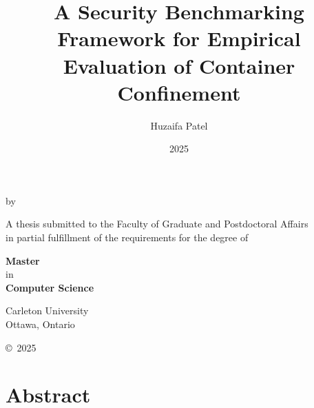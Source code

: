 \documentclass[12pt]{report}
\begin{document}
	\title{A Security Benchmarking Framework for Empirical Evaluation of Container Confinement}
\author{Huzaifa Patel}
\date{2025}

\makeatletter
\begin{titlepage}
     \begin{center}
        \vspace*{3cm} 

        {\LARGE \textbf{\@title} \par} 

        \vspace{0.5cm}

        \vspace{2cm}
        \large{by}
        \vspace{0.5cm}

        {\Large \textbf{\@author}} 

        \vfill

        {\large A thesis submitted to the Faculty of Graduate and Postdoctoral Affairs\\
        in partial fulfillment of the requirements for the degree of}

        \vspace{1cm}

        \large{{\textbf{Master}} \\
        {in} \\
        {\textbf{Computer Science}}}
        

        \vspace{2cm}

        \large{Carleton University\\
        Ottawa, Ontario}

        \vspace{1.5cm}


        \vfill

        \copyright{}~2025 \@author
    \end{center}
\end{titlepage}
\makeatother 	\chapter*{Abstract}
\fontsize{12pt}{14pt} \selectfont
\end{document}
